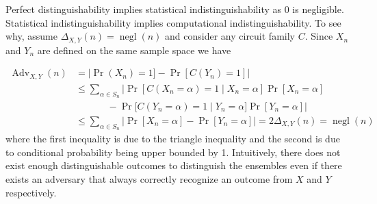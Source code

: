 Perfect distinguishability implies statistical indistinguishability as 0 is negligible. Statistical indistinguishability implies computational indistinguishability. To see why, assume $\Delta_{X,Y}(n) = \operatorname{negl}(n)$ and consider any circuit family $C$. Since $X_n$ and $Y_n$ are defined on the same sample space we have

\begin{equation*}
\begin{aligned}
    \operatorname{Adv}_{X,Y}(n) &= |\operatorname{Pr}(X_n) = 1] - \operatorname{Pr}[C(Y_n) = 1]|\\
        &\leq \sum_{\alpha \in S_n} | \operatorname{Pr}[C(X_n = \alpha) = 1 \; | \; X_n = \alpha]\operatorname{Pr}[X_n = \alpha] \\
        &\phantom{=} \qquad - \operatorname{Pr}[C(Y_n = \alpha) = 1 \; | \; Y_n = \alpha]\operatorname{Pr}[Y_n = \alpha] | \\
        &\leq \sum_{\alpha \in S_n} | \operatorname{Pr}[X_n = \alpha] - \operatorname{Pr}[Y_n = \alpha]| = 2\Delta_{X,Y}(n) = \operatorname{negl}(n)
\end{aligned}
\end{equation*}
where the first inequality is due to the triangle inequality and the second is due to conditional probability being upper bounded by 1. Intuitively, there does not exist enough distinguishable outcomes to distinguish the ensembles even if there exists an adversary that always correctly recognize an outcome from $X$ and $Y$ respectively.


